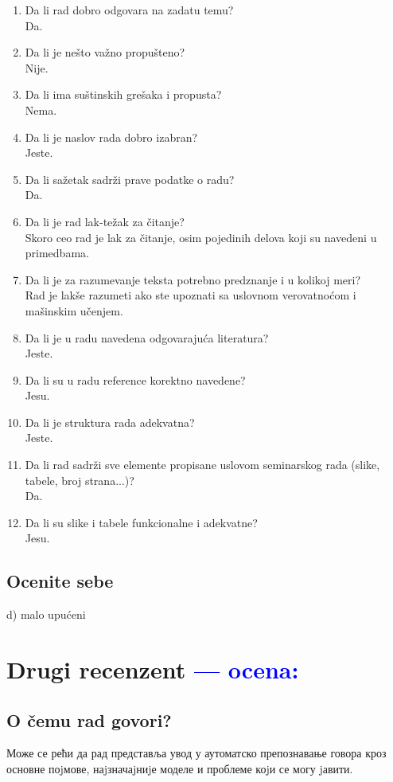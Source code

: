 \documentclass[a4paper]{report}
\newcommand{\odgovor}[1]{\textcolor{blue}{#1}}
\begin{document}
\begin{enumerate}
\item Da li rad dobro odgovara na zadatu temu?\\
Da.
\item Da li je nešto važno propušteno?\\
Nije.
\item Da li ima suštinskih grešaka i propusta?\\
Nema.
\item Da li je naslov rada dobro izabran?\\
Jeste.
\item Da li sažetak sadrži prave podatke o radu?\\
Da.
\item Da li je rad lak-težak za čitanje?\\
Skoro ceo rad je lak za čitanje, osim pojedinih delova koji su navedeni u primedbama.
\item Da li je za razumevanje teksta potrebno predznanje i u kolikoj meri?\\
Rad je lakše razumeti ako ste upoznati sa uslovnom verovatnoćom i mašinskim učenjem.
\item Da li je u radu navedena odgovarajuća literatura?\\
Jeste.
\item Da li su u radu reference korektno navedene?\\
Jesu.
\item Da li je struktura rada adekvatna?\\
Jeste.
\item Da li rad sadrži sve elemente propisane uslovom seminarskog rada (slike, tabele, broj strana...)?\\
Da.
\item Da li su slike i tabele funkcionalne i adekvatne?\\
Jesu.
\end{enumerate}

\section{Ocenite sebe}
 d) malo upućeni 



\chapter{Drugi recenzent \odgovor{--- ocena:} }
\section{O čemu rad govori?}
Може се рећи да рад представља увод у аутоматско препознавање говора кроз основне поjмове, наjзначаjниjе моделе и проблеме коjи се могу jавити.
\end{document}
